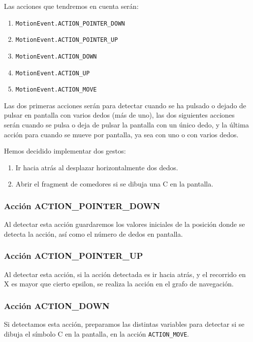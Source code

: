 Las acciones que tendremos en cuenta serán:

\begin{enumerate}
	\item \texttt{MotionEvent.ACTION\_POINTER\_DOWN}
	\item \texttt{MotionEvent.ACTION\_POINTER\_UP}
	\item \texttt{MotionEvent.ACTION\_DOWN}
	\item \texttt{MotionEvent.ACTION\_UP}
	\item \texttt{MotionEvent.ACTION\_MOVE}
\end{enumerate}

Las dos primeras acciones serán para detectar cuando se ha pulsado o dejado de pulsar en pantalla con varios dedos (más de uno), las dos siguientes acciones serán cuando se pulsa o deja de pulsar la pantalla con un único dedo, y la última acción para cuando se mueve por pantalla, ya sea con uno o con varios dedos.

Hemos decidido implementar dos gestos:

\begin{enumerate}
	\item Ir hacia atrás al desplazar horizontalmente dos dedos.
	\item Abrir el fragment de comedores si se dibuja una C en la pantalla.
\end{enumerate}

\subsubsection{Acción ACTION\_POINTER\_DOWN}

Al detectar esta acción guardaremos los valores iniciales de la posición donde se detecta la acción, así como el número de dedos en pantalla.

\subsubsection{Acción ACTION\_POINTER\_UP}

Al detectar esta acción, si la acción detectada es ir hacia atrás, y el recorrido en X es mayor que cierto epsilon, se realiza la acción en el grafo de navegación.

\subsubsection{Acción ACTION\_DOWN}

Si detectamos esta acción, preparamos las distintas variables para detectar si se dibuja el símbolo C en la pantalla, en la acción \texttt{ACTION\_MOVE}.

